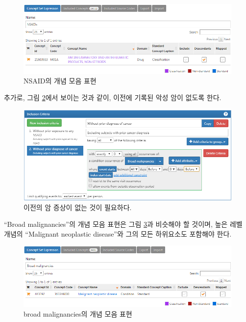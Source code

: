 \documentclass[10.5pt]{book}
\theoremstyle{definition}
\theoremstyle{definition}
\theoremstyle{definition}
\theoremstyle{remark}
\begin{document}
\begin{figure}

{\centering \includegraphics[width=1\linewidth]{images/SuggestedAnswers/cohortsAtlasConceptSet2} 

}

\caption{NSAID의 개념 모음 표현}\label{fig:cohortsAtlasConceptSet2}
\end{figure}

추가로, 그림 \ref{fig:cohortsAtlasInclusion2}에서 보이는 것과 같이,
이전에 기록된 악성 암이 없도록 한다.

\begin{figure}

{\centering \includegraphics[width=1\linewidth]{images/SuggestedAnswers/cohortsAtlasInclusion2} 

}

\caption{이전의 암 증상이 없는 것이 필요하다.}\label{fig:cohortsAtlasInclusion2}
\end{figure}

``Broad malignancies''의 개념 모음 표현은 그림
\ref{fig:cohortsAtlasConceptSet3}과 비슷해야 할 것이며, 높은 레벨 개념의
``Malignant neoplastic disease''와 그의 모든 하위요소도 포함해야 한다.

\begin{figure}

{\centering \includegraphics[width=1\linewidth]{images/SuggestedAnswers/cohortsAtlasConceptSet3} 

}

\caption{broad malignancies의 개념 모음 표현}\label{fig:cohortsAtlasConceptSet3}
\end{figure}
\end{document}
